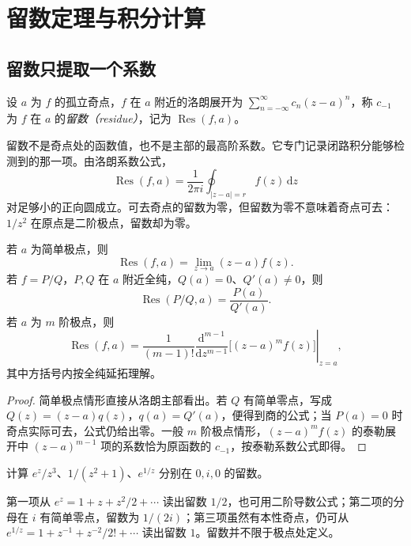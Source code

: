 \setcounter{chapter}{8} %
\chapter{留数定理与积分计算}
\label{chap:ca-residue}

\section{留数只提取一个系数}

\begin{definition}[留数]
设 $a$ 为 $f$ 的孤立奇点，$f$ 在 $a$ 附近的洛朗展开为 $\sum_{n=-\infty}^\infty c_n(z-a)^n$，称 $c_{-1}$ 为 $f$ 在 $a$ 的\emph{留数（residue）}，记为 $\operatorname{Res}(f,a)$。
\end{definition}

留数不是奇点处的函数值，也不是主部的最高阶系数。它专门记录闭路积分能够检测到的那一项。由洛朗系数公式，
\[
 \operatorname{Res}(f,a)=\frac1{2\pi i}\oint_{|z-a|=r}f(z)\,\mathrm dz
\]
对足够小的正向圆成立。可去奇点的留数为零，但留数为零不意味着奇点可去：$1/z^2$ 在原点是二阶极点，留数却为零。

\begin{proposition}[常用留数公式]
\label{prop:ca-residue-formula}
若 $a$ 为简单极点，则
\[
 \operatorname{Res}(f,a)=\lim_{z\to a}(z-a)f(z).
\]
若 $f=P/Q$，$P,Q$ 在 $a$ 附近全纯，$Q(a)=0$、$Q'(a)\ne0$，则
\begin{equation}
 \operatorname{Res}(P/Q,a)=\frac{P(a)}{Q'(a)}.
 \label{eq:ca-simple-residue}
\end{equation}
若 $a$ 为 $m$ 阶极点，则
\begin{equation}
 \operatorname{Res}(f,a)=\frac1{(m-1)!}
 \left.\frac{\mathrm d^{m-1}}{\mathrm dz^{m-1}}
 \bigl[(z-a)^mf(z)\bigr]\right|_{z=a},
 \label{eq:ca-pole-residue}
\end{equation}
其中方括号内按全纯延拓理解。
\end{proposition}
\begin{proof}
简单极点情形直接从洛朗主部看出。若 $Q$ 有简单零点，写成 $Q(z)=(z-a)q(z)$，$q(a)=Q'(a)$，便得到商的公式；当 $P(a)=0$ 时奇点实际可去，公式仍给出零。一般 $m$ 阶极点情形，$(z-a)^mf(z)$ 的泰勒展开中 $(z-a)^{m-1}$ 项的系数恰为原函数的 $c_{-1}$，按泰勒系数公式即得。
\end{proof}

\begin{example}[选用最短的计算途径]
计算 $e^z/z^3$、$1/(z^2+1)$、$e^{1/z}$ 分别在 $0,i,0$ 的留数。
\end{example}
\begin{solve}
第一项从 $e^z=1+z+z^2/2+\cdots$ 读出留数 $1/2$，也可用二阶导数公式；第二项的分母在 $i$ 有简单零点，留数为 $1/(2i)$；第三项虽然有本性奇点，仍可从 $e^{1/z}=1+z^{-1}+z^{-2}/2!+\cdots$ 读出留数 $1$。留数并不限于极点处定义。
\end{solve}

